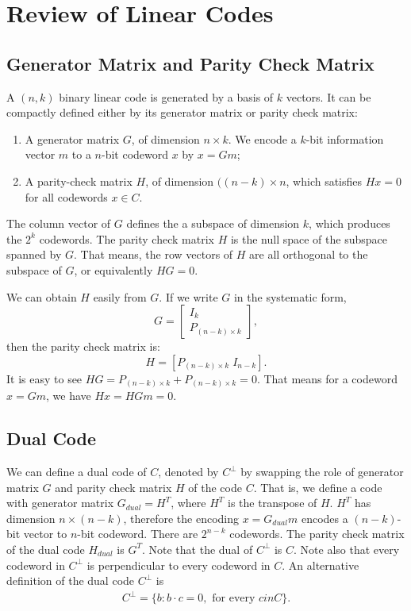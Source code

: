\section{Review of Linear Codes}
\subsection{Generator Matrix and Parity Check Matrix}
A \((n,k)\) binary linear code is generated by a basis of \(k\) vectors. It can be compactly defined either by its generator matrix or parity check matrix:  
\begin{enumerate}
    \item A generator matrix \(G\), of dimension \(n \times k\). We encode a \(k\)-bit information vector \(m\) to a \(n\)-bit codeword \(x\) by \(x = Gm\);
    \item A parity-check matrix \(H\), of dimension \(((n-k) \times n\), which satisfies \(Hx = 0\) for all codewords \(x \in C\).
\end{enumerate}
The column vector of \(G\) defines the a subspace of dimension \(k\), which produces the \(2^k\) codewords. The parity check matrix \(H\) is the null space of the subspace spanned by \(G\). That means, the row vectors of \(H\) are all orthogonal to the subspace of \(G\), or equivalently \(HG = 0\). 

We can obtain \(H\) easily from \(G\). If we write \(G\) in the systematic form,  
$$G = \begin{bmatrix}
    I_{k} \\
    P_{(n-k)\times k}
    \end{bmatrix},
$$
then the parity check matrix is:
\[H = [P_{(n-k)\times k} \; I_{n-k}].\] It is easy to see \(HG = P_{(n-k)\times k} + P_{(n-k)\times k} = 0\). That means for a codeword \(x= Gm\), we have \(Hx = HGm = 0\). 

\subsection{Dual Code}
We can define a dual code of \(C\), denoted by \(C^{\perp}\) by swapping the role of generator matrix \(G\) and parity check matrix \(H\) of the code \(C\). That is, we define a code with generator matrix \(G_{dual} = H^T\), where \(H^T\) is the transpose of \(H\). \(H^T\) has dimension \(n \times (n-k)\), therefore the encoding \(x = G_{dual} m\) encodes a \((n-k)\)-bit vector to \(n\)-bit codeword. There are \(2^{n-k}\) codewords. The parity check matrix of the dual code \(H_{dual}\) is \(G^T\). Note that the dual of \(C^{\perp}\) is \(C\). Note also that every codeword in \(C^{\perp}\) is perpendicular to every codeword in \(C\). An alternative definition of the dual code \(C^{\perp}\) is
\begin{align*}
C^{\perp} = \{b: b\cdot c = 0, \text{ for every } c in C\}. 
\end{align*}



